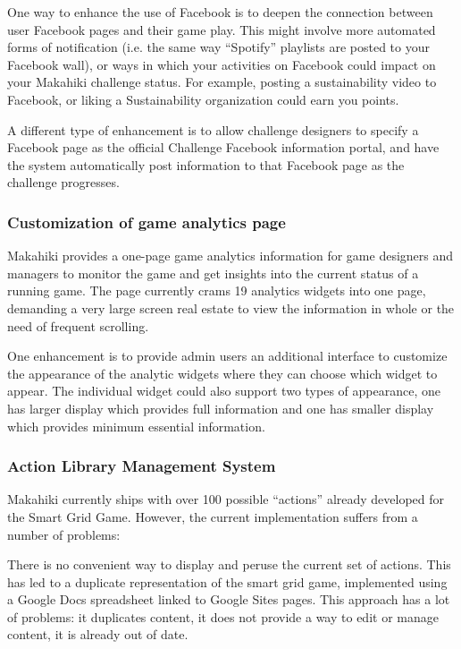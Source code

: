 One way to enhance the use of Facebook is to deepen the connection between user Facebook pages and their game play. This might involve more automated forms of notification (i.e. the same way ``Spotify'' playlists are posted to your Facebook wall), or ways in which your activities on Facebook could impact on your Makahiki challenge status. For example, posting a sustainability video to Facebook, or liking a Sustainability organization could earn you points. 

A different type of enhancement is to allow challenge designers to specify a Facebook page as the official Challenge Facebook information portal, and have the system automatically post information to that Facebook page as the challenge progresses.

\subsubsection{Customization of game analytics page}
\label{sec:future-game-manage}
Makahiki provides a one-page game analytics information for game designers and managers to monitor the game and get insights into the current status of a running game. The page currently crams 19 analytics widgets into one page, demanding a very large screen real estate to view the information in whole or the need of frequent scrolling. 

One enhancement is to provide admin users an additional interface to customize the appearance of the analytic widgets where they can choose which widget to appear. The individual widget could also support two types of appearance, one has larger display which provides full information and one has smaller display which provides minimum essential information. 

\subsubsection{Action Library Management System}
Makahiki currently ships with over 100 possible  ``actions'' already developed for the Smart Grid Game. However, the current implementation suffers from a number of problems:

There is no convenient way to display and peruse the current set of actions. This has led to a duplicate representation of the smart grid game, implemented using a Google Docs spreadsheet linked to Google Sites pages. This approach has a lot of problems: it duplicates content, it does not provide a way to edit or manage content, it is already out of date.

